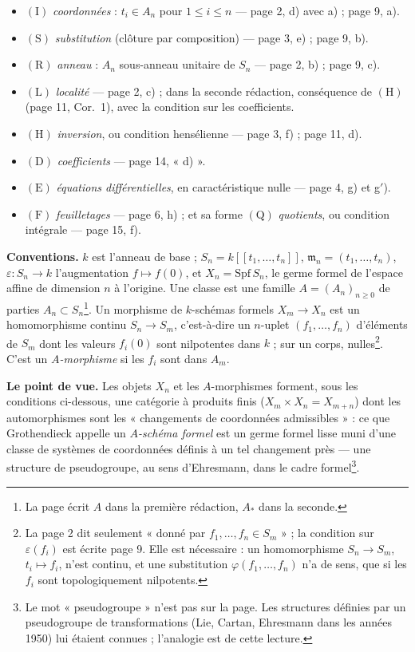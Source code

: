 \documentclass[11pt,a4paper]{article}
\begin{document}
\begin{itemize}
  \item $(\mathrm{I})$ \emph{coordonnées} : $t_i \in A_n$ pour $1 \leq i \leq n$ —
    page 2, d) avec a) ; page 9, a).
  \item $(\mathrm{S})$ \emph{substitution} (clôture par composition) — page 3,
    e) ; page 9, b).
  \item $(\mathrm{R})$ \emph{anneau} : $A_n$ sous-anneau unitaire de $S_n$ —
    page 2, b) ; page 9, c).
  \item $(\mathrm{L})$ \emph{localité} — page 2, c) ; dans la seconde
    rédaction, conséquence de $(\mathrm{H})$ (page 11, Cor.~1), avec la condition
    sur les coefficients.
  \item $(\mathrm{H})$ \emph{inversion}, ou condition hensélienne — page 3,
    f) ; page 11, d).
  \item $(\mathrm{D})$ \emph{coefficients} — page 14, « d) ».
  \item $(\mathrm{E})$ \emph{équations différentielles}, en caractéristique
    nulle — page 4, g) et g$'$).
  \item $(\mathrm{F})$ \emph{feuilletages} — page 6, h) ; et sa forme
    $(\mathrm{Q})$ \emph{quotients}, ou condition intégrale — page 15, f).
\end{itemize}

\textbf{Conventions.} $k$ est l'anneau de base ; $S_n = k[[t_1, \ldots, t_n]]$,
$\mathfrak{m}_n = (t_1, \ldots, t_n)$, $\varepsilon : S_n \to k$ l'augmentation
$f \mapsto f(0)$, et $X_n = \mathrm{Spf}\, S_n$, le germe formel de l'espace
affine de dimension $n$ à l'origine. Une classe est une famille
$A = (A_n)_{n \geq 0}$ de parties $A_n \subset S_n$\footnote{La page écrit $A$
dans la première rédaction, $A_*$ dans la seconde.}. Un morphisme de
$k$-schémas formels $X_m \to X_n$ est un homomorphisme continu
$S_n \to S_m$, c'est-à-dire un $n$-uplet $(f_1, \ldots, f_n)$ d'éléments de
$S_m$ dont les valeurs $f_i(0)$ sont nilpotentes dans $k$ ; sur un corps,
nulles\footnote{La page 2 dit seulement « donné par $f_1, \ldots, f_n \in S_m$ » ;
la condition sur $\varepsilon(f_i)$ est écrite page 9. Elle est nécessaire : un
homomorphisme $S_n \to S_m$, $t_i \mapsto f_i$, n'est continu, et une
substitution $\varphi(f_1, \ldots, f_n)$ n'a de sens, que si les $f_i$ sont
topologiquement nilpotents.}. C'est un \emph{$A$-morphisme} si les $f_i$ sont
dans $A_m$.

\textbf{Le point de vue.} Les objets $X_n$ et les $A$-morphismes forment,
sous les conditions ci-dessous, une catégorie à produits finis
($X_m \times X_n = X_{m+n}$) dont les automorphismes sont les « changements de
coordonnées admissibles » : ce que Grothendieck appelle un \emph{$A$-schéma
formel} est un germe formel lisse muni d'une classe de systèmes de coordonnées
définis à un tel changement près — une structure de pseudogroupe, au sens
d'Ehresmann, dans le cadre formel\footnote{Le mot « pseudogroupe » n'est pas
sur la page. Les structures définies par un pseudogroupe de transformations
(Lie, Cartan, Ehresmann dans les années 1950) lui étaient connues ;
l'analogie est de cette lecture.}.
\end{document}
